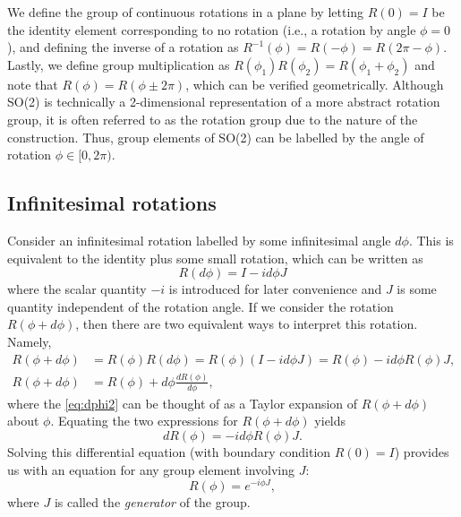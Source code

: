 We define the group of continuous rotations in a plane by letting $R(0) = I$ be the identity element corresponding to no rotation (i.e., a rotation by angle $\phi=0$), and defining the inverse of a rotation as $R^{-1}(\phi) = R(-\phi) = R(2\pi-\phi)$. Lastly, we define group multiplication as $R(\phi_1)R(\phi_2) = R(\phi_1+\phi_2)$ and note that $R(\phi) = R(\phi\pm2\pi)$, which can be verified geometrically. Although SO(2) is technically a 2-dimensional representation of a more abstract rotation group, it is often referred to as the rotation group due to the nature of the construction. Thus, group elements of SO(2) can be labelled by the angle of rotation $\phi\in[0,2\pi)$.

\subsection{Infinitesimal rotations}\label{sub:inf_rot}
Consider an infinitesimal rotation labelled by some infinitesimal angle $d\phi$. This is equivalent to the identity plus some small rotation, which can be written as
\begin{equation}
    R(d\phi) = I - i d\phi J \label{eq:dphi}
\end{equation}
where the scalar quantity $-i$ is introduced for later convenience and $J$ is some quantity independent of the rotation angle. If we consider the rotation $R(\phi + d\phi)$, then there are two equivalent ways to interpret this rotation. Namely,
\begin{align}
    R(\phi + d\phi) &= R(\phi)R(d\phi) = R(\phi)(I - i d\phi J) = R(\phi) - i d\phi R(\phi)J,\label{eq:dphi1} \\
    R(\phi + d\phi) &= R(\phi) + d\phi\frac{dR(\phi)}{d\phi},\label{eq:dphi2}
\end{align}
where the \cref{eq:dphi2} can be thought of as a Taylor expansion of $R(\phi + d\phi)$ about $\phi$. Equating the two expressions for $R(\phi + d\phi)$ yields
\begin{equation}
    dR(\phi) = -id\phi R(\phi)J.
\end{equation}
Solving this differential equation (with boundary condition $R(0)=I$) provides us with an equation for any group element involving $J$:
\begin{equation}
    R(\phi) = e^{-i\phi J},
\end{equation}
where $J$ is called the \textit{generator} of the group.

